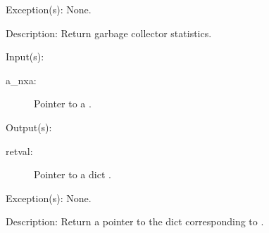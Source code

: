 \begin{capi}
\begin{capilist}
	\item[Exception(s): ] None.
	\item[Description: ]
		Return garbage collector statistics.
	\end{capilist}
\label{nxa_gcdict_get}
	\begin{capilist}
	\item[Input(s): ]
		\begin{description}\item[]
		\item[a\_nxa: ]
			Pointer to a .
		\end{description}
	\item[Output(s): ]
		\begin{description}\item[]
		\item[retval: ]
			Pointer to a dict .
		\end{description}
	\item[Exception(s): ] None.
	\item[Description: ]
		Return a pointer to the dict  corresponding to
		.
	\end{capilist}
\end{capi}
